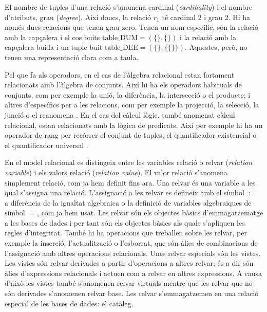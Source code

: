 El nombre de tuples d'una relació s'anomena cardinal
(\emph{cardinality}) i el nombre d'atributs, grau
(\emph{degree}). Així doncs, la relació $r_1$ té cardinal 2 i grau 2.
Hi ha només dues relacions que tenen grau zero. Tenen un nom
específic, són la relació amb la capçalera i el cos buits
$\text{table\_DUM} = (\{\},\{\})$ i la relació amb la capçalera buida
i un tuple buit $\text{table\_DEE} = (\{\},\{\{\}\})$. Aquestes, però, no
tenen una representació clara com a taula.  



Pel que fa als operadors, en el cas de l'àlgebra relacional estan
fortament relacionats amb l'àlgebra de conjunts. Així hi ha els
operadors habituals de conjunts, com per exemple la unió, la
diferència, la intersecció o el producte; i altres d'específics per a
les relacions, com per exemple la projecció, la selecció, la junció o
el reanomena \parencite[\gls{capitol}~7]{date04:introduction8}.  En el cas del
càlcul lògic, també anomenat càlcul relacional, estan relacionats amb
la lògica de predicats. Així per exemple hi ha un operador de rang per
recórrer el conjunt de tuples, el quantificador existencial o el
quantificador universal \parencite[cap.~8]{date04:introduction8}.



En el model relacional es distingeix entre les variables relació o
relvar (\emph{relation variable}) i els valors relació (\emph{relation
  value}). El valor relació s'anomena simplement relació, com ja hem
definit fins ara.  Una relvar és una variable a les qual s'assigna una
relació.  L'assignació a les relvar es defineix amb el símbol $:=$ a
diferència de la igualtat algebraica o la definició de variables
algebraiques de símbol $=$, com ja hem usat.  Les relvar són els
objectes bàsics d'emmagatzematge a les bases de dades i per tant són
els objectes bàsics als quals s'apliquen les regles
d'integritat. També hi ha operacions que treballen sobre les relvar,
per exemple la inserció, l'actualització o l'esborrat, que són àlies
de combinacions de l'assignació amb altres operacions relacionals.
Unes relvar especials són les vistes. Les vistes són relvar derivades
a partir d'operacions a altres relvar; és a dir són àlies
d'expressions relacionals i actuen com a relvar en altres
expressions. A causa d'això les vistes també s'anomenen relvar
virtuals mentre que les relvar que no són derivades s'anomenen relvar
base. Les relvar s'emmagatzemen en una relació especial de les bases
de dades: el catàleg.






